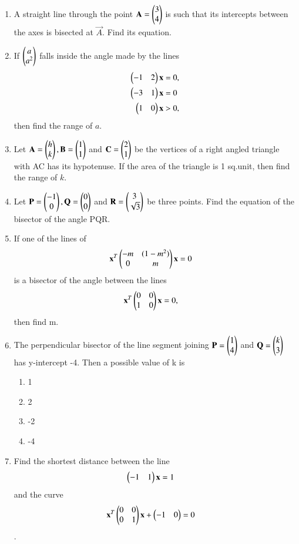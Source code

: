 \begin{enumerate}[label=\arabic*.,ref=\thesubsection.\theenumi]
    \item A straight line through the point $\mathbf{A} = \begin{pmatrix}3\\4\end{pmatrix}$ is such that its intercepts between the axes is bisected at $\vec{A}$. Find its equation.
    \item If $\begin{pmatrix}a\\a^2\end{pmatrix}$ falls inside the angle made by the lines \begin{align}\begin{pmatrix}-1 & 2\end{pmatrix} \mathbf {x} &= 0,  \\ \begin{pmatrix}-3 & 1\end{pmatrix} \mathbf {x} &= 0 \\ \begin{pmatrix}1 & 0\end{pmatrix} \mathbf{x} &> 0,\end{align} then find the range of $a$. 
    \item Let $\mathbf{A}=\begin{pmatrix}h\\k\end{pmatrix}, \mathbf{B}=\begin{pmatrix}1\\1\end{pmatrix}$ and  $\mathbf{C}=\begin{pmatrix}2\\1\end{pmatrix}$ be the vertices of a right angled triangle with AC has its hypotenuse. If the area of the triangle is 1 sq.unit, then find the range of $k$.
    \item Let $\mathbf{P}=\begin{pmatrix}-1\\0\end{pmatrix}, \mathbf{Q}=\begin{pmatrix}0\\0\end{pmatrix}$ and $\mathbf{R}=\begin{pmatrix}3\\\sqrt3\end{pmatrix}$ be three points. Find the equation of the bisector of the angle PQR. 
    \item If one of the lines of \begin{align}\mathbf{x}^T\begin{pmatrix}-m & (1-m^2) \\ 0 & m\end{pmatrix} \mathbf {x} &= 0\end{align} is a bisector of the angle between the lines  \begin{align}\mathbf{x}^T\begin{pmatrix}0 & 0 \\ 1 & 0\end{pmatrix} \mathbf {x} &= 0,\end{align} then find m.
    \item The perpendicular bisector of the line segment joining $\mathbf{P}=\begin{pmatrix}1\\4\end{pmatrix}$ and $\mathbf{Q}=\begin{pmatrix}k\\3\end{pmatrix}$ has y-intercept -4. Then a possible value of k is
    \begin{enumerate}
     \item  1 
     \item  2
     \item  -2
     \item  -4
     \end{enumerate}
    \item Find the shortest distance between the line \begin{align}\begin{pmatrix}-1 & 1\end{pmatrix}\mathbf{x} &= 1\end{align} and the curve \begin{align}\mathbf{x}^T\begin{pmatrix}0 & 0 \\ 0 & 1\end{pmatrix} \mathbf {x} + \begin{pmatrix}-1 & 0\end{pmatrix} &= 0\end{align}.

\end{enumerate}
